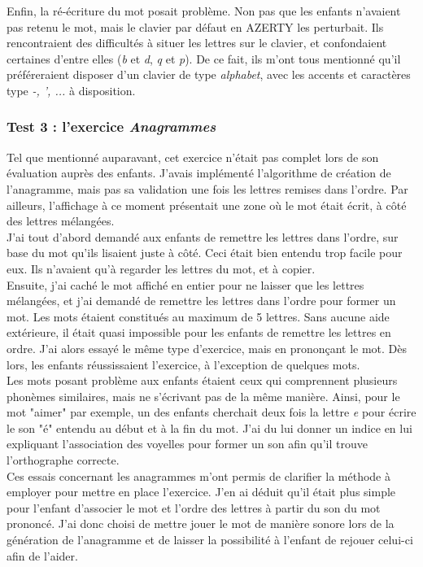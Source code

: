 Enfin, la ré-écriture du mot posait problème. Non pas que les enfants n'avaient pas retenu le mot, mais le clavier par défaut en AZERTY les perturbait. Ils rencontraient des difficultés à situer les lettres sur le clavier, et confondaient certaines d'entre elles (\textit{b} et \textit{d}, \textit{q} et \textit{p}). De ce fait, ils m'ont tous mentionné qu'il préféreraient disposer d'un clavier de type \textit{alphabet}, avec les accents et caractères type \textit{-, ', ...} à disposition.

\subsubsection{Test 3 : l'exercice \textit{Anagrammes}}
Tel que mentionné auparavant, cet exercice n'était pas complet lors de son évaluation auprès des enfants. J'avais implémenté l'algorithme de création de l'anagramme, mais pas sa validation une fois les lettres remises dans l'ordre. Par ailleurs, l'affichage à ce moment présentait une zone où le mot était écrit, à côté des lettres mélangées.\\

J'ai tout d'abord demandé aux enfants de remettre les lettres dans l'ordre, sur base du mot qu'ils lisaient juste à côté. Ceci était bien entendu trop facile pour eux. Ils n'avaient qu'à regarder les lettres du mot, et à copier.\\

Ensuite, j'ai caché le mot affiché en entier pour ne laisser que les lettres mélangées, et j'ai demandé de remettre les lettres dans l'ordre pour former un mot. Les mots étaient constitués au maximum de 5 lettres. Sans aucune aide extérieure, il était quasi impossible pour les enfants de remettre les lettres en ordre. J'ai alors essayé le même type d'exercice, mais en prononçant le mot. Dès lors, les enfants réussissaient l'exercice, à l'exception de quelques mots.\\

Les mots posant problème aux enfants étaient ceux qui comprennent plusieurs phonèmes similaires, mais ne s'écrivant pas de la même manière. Ainsi, pour le mot "aimer" par exemple, un des enfants cherchait deux fois la lettre \textit{e} pour écrire le son "é" entendu au début et à la fin du mot. J'ai du lui donner un indice en lui expliquant l'association des voyelles pour former un son afin qu'il trouve l'orthographe correcte.\\

Ces essais concernant les anagrammes m'ont permis de clarifier la méthode à employer pour mettre en place l'exercice. J'en ai déduit qu'il était plus simple pour l'enfant d'associer le mot et l'ordre des lettres à partir du son du mot prononcé. J'ai donc choisi de mettre jouer le mot de manière sonore lors de la génération de l'anagramme et de laisser la possibilité à l'enfant de rejouer celui-ci afin de l'aider.

